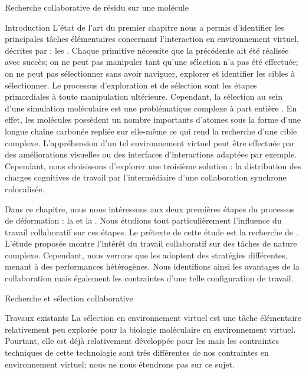 \documentclass[myfrancais]{mythesis}
\begin{document}
	\begin{mychapter}{Recherche collaborative de résidu sur une molécule}
		\begin{mysection}{Introduction}
			L'état de l'art du premier chapitre nous a permis d'identifier les principales tâches élémentaires concernant l'interaction en environnement virtuel, décrites par  : les  .
			Chaque primitive nécessite que la précédente ait été réalisée avec succès; on ne peut pas manipuler tant qu'une sélection n'a pas été effectuée; on ne peut pas sélectionner sans avoir naviguer, explorer et identifier les cibles à sélectionner.
			Le processus d'exploration et de sélection sont les étapes primordiales à toute manipulation ultérieure.
			Cependant, la sélection au sein d'une simulation moléculaire est une problématique complexe à part entière .
			En effet, les molécules possèdent un nombre importants d'atomes sous la forme d'une longue chaîne carbonée repliée sur elle-même ce qui rend la recherche d'une cible complexe.
			L'appréhension d'un tel environnement virtuel peut être effectuée par des améliorations visuelles  ou des interfaces d'interactions adaptées  par exemple.
			Cependant, nous choisissons d'explorer une troisième solution : la distribution des charges cognitives de travail par l'intermédiaire d'une collaboration synchrone colocalisée.

			Dans ce chapitre, nous nous intéressons aux deux premières étapes du processus de déformation : la  et la  .
			Nous étudions tout particulièrement l'influence du travail collaboratif sur ces étapes.
			Le prétexte de cette étude est la recherche de .
			L'étude proposée montre l'intérêt du travail collaboratif sur des tâches de nature complexe.
			Cependant, nous verrons que les  adoptent des stratégies différentes, menant à des performances hétérogènes.
			Nous identifions ainsi les avantages de la collaboration mais également les contraintes d'une telle configuration de travail.
		\end{mysection}
		\begin{mysection}{Recherche et sélection collaborative}
			\begin{mysubsection}{Travaux existants}
				La sélection en environnement virtuel est une tâche élémentaire relativement peu explorée pour la biologie moléculaire en environnement virtuel.
				Pourtant, elle est déjà relativement développée pour les  mais les contraintes techniques de cette technologie sont très différentes de nos contraintes en environnement virtuel; nous ne nous étendrons pas sur ce sujet.


\end{mysubsection}
\end{mysection}
\end{mychapter}
\end{document}
